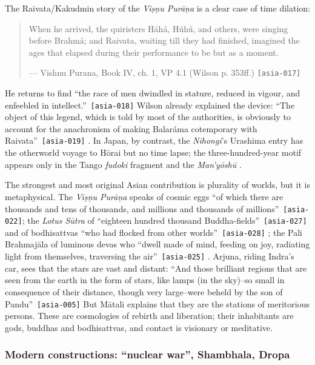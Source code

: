 \documentclass[11pt,a4paper]{article}
\newcommand{\pid}[1]{\texttt{\small #1}}
\begin{document}
The Raivata/Kakudmin story of the \emph{Viṣṇu Purāṇa} is a clear case of time dilation: 
\begin{quote}\small When he arrived, the quiristers Háhá, Húhú, and others, were singing before Brahmá; and Raivata, waiting till they had finished, imagined the ages that elapsed during their performance to be but as a moment.\par\hfill{\footnotesize --- Vishnu Purana, Book IV, ch. 1, VP 4.1 (Wilson p. 353ff.) \pid{[asia-017]}}\end{quote}
 He returns to find \enquote{the race of men dwindled in stature, reduced in vigour, and enfeebled in intellect.}~\pid{[asia-018]} Wilson already explained the device: \enquote{The object of this legend, which is told by most of the authorities, is obviously to account for the anachronism of making Balaráma cotemporary with Raivata}~\pid{[asia-019]} \parencite{wilson1840vishnu}. In Japan, by contrast, the \emph{Nihongi}'s Urashima entry has the otherworld voyage to Hōrai but no time lapse; the three-hundred-year motif appears only in the Tango \emph{fudoki} fragment and the \emph{Man'yōshū} \parencite{nicolae2017myth}.

The strongest and most original Asian contribution is plurality of worlds, but it is metaphysical. The \emph{Viṣṇu Purāṇa} speaks of cosmic eggs \enquote{of which there are thousands and tens of thousands, and millions and thousands of millions}~\pid{[asia-022]}; the \emph{Lotus Sūtra} of \enquote{eighteen hundred thousand Buddha-fields}~\pid{[asia-027]} and of bodhisattvas \enquote{who had flocked from other worlds}~\pid{[asia-028]} \parencite{kern1884lotus}; the Pali Brahmajāla of luminous devas who \enquote{dwell made of mind, feeding on joy, radiating light from themselves, traversing the air}~\pid{[asia-025]} \parencite{rhysdavids1899dialogues}. Arjuna, riding Indra's car, sees that the stars are vast and distant: \enquote{And those brilliant regions that are seen from the earth in the form of stars, like lamps (in the sky)--so small in consequence of their distance, though very large--were beheld by the son of Pandu}~\pid{[asia-005]} But Mātali explains that they are the stations of meritorious persons. These are cosmologies of rebirth and liberation; their inhabitants are gods, buddhas and bodhisattvas, and contact is visionary or meditative.

\subsubsection{Modern constructions: ``nuclear war'', Shambhala, Dropa}
\end{document}
